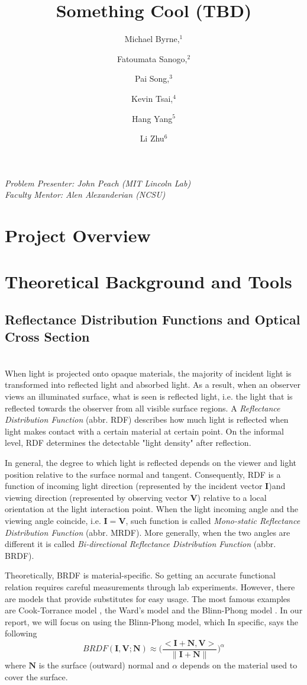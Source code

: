 \documentclass[11pt]{amsart}
\author{Michael Byrne,$^1$}
\author{Fatoumata Sanogo,$^2$}
\author{Pai Song,$^3$\\}
\author{Kevin Tsai,$^4$}
\author{Hang Yang$^5$}
\author{Li Zhu$^6$}
\title{Something Cool (TBD)}
\theoremstyle{definition}
\begin{document}
\maketitle

{
\noindent
\textit{
Problem Presenter:  John Peach (MIT Lincoln Lab)\\
Faculty Mentor: Alen Alexanderian (NCSU)
}
}
\section{Project Overview}

\section{Theoretical Background and Tools}
\subsection{Reflectance Distribution Functions and Optical Cross Section}~\\
When light is projected onto opaque materials, the majority of incident light is transformed into reflected light and absorbed light. As a result, when an observer views an illuminated surface, what is seen is reflected light, i.e. the light that is reflected towards the observer from all visible surface regions. A \textit{Reflectance Distribution Function} (abbr. RDF) describes how much light is reflected when light makes contact with a certain material at certain point. On the informal level, RDF determines the detectable "light density" after reflection. 

In general, the degree to which light is reflected depends on the viewer and light position relative to the surface normal and tangent. Consequently, RDF is a function of incoming light direction (represented by the incident vector \textbf{I})and viewing direction (represented by observing vector \textbf{V}) relative to a local orientation at the light interaction point. When the light incoming angle and the viewing angle coincide, i.e. $\mathbf{I}=\mathbf{V}$, such function is called \textit{Mono-static Reflectance Distribution Function} (abbr. MRDF). More generally, when the two angles are different it is called \textit{Bi-directional Reflectance Distribution Function} (abbr. BRDF). 

Theoretically, BRDF is material-specific. So getting an accurate functional relation requires careful measurements through lab experiments. However, there are models that provide substitutes for easy usage. The most famous examples are Cook-Torrance model \cite{CookTorr}, the Ward's model \cite{Ward} and the Blinn-Phong model \cite{BlinnPhong}. In our report, we will focus on using the Blinn-Phong model, which In specific, says the following 
$$BRDF(\mathbf{I},\mathbf{V};\mathbf{N})\approx \bigg(\frac{<\mathbf{I}+\mathbf{N},\mathbf{V}>}{\|\mathbf{I}+\mathbf{N}\|}\bigg)^\alpha$$
where $\mathbf{N}$ is the surface (outward) normal and $\alpha$ depends on the material used to cover the surface. 
\end{document}
